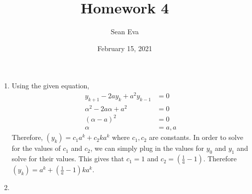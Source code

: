 \documentclass{article}
\title{Homework 4}
\author{Sean Eva}
\date{February 15, 2021}
\begin{document}
\maketitle

\begin{enumerate}
    \item 
    
    Using the given equation, 
    \begin{align*}
        y_{k+1}-2ay_k+a^2y_{k-1}&=0\\
        \alpha^2-2a\alpha+a^2 &= 0\\
        (\alpha-a)^2 &= 0\\
        \alpha &= a, a
    \end{align*}
    Therefore, $(y_k) = c_1a^k + c_2ka^k$ where $c_1, c_2$ are constants. In order to solve for the values of $c_1$ and $c_2$, we can simply plug in the values for $y_0$ and $y_1$ and solve for their values. This gives that $c_1=1$ and $c_2 = (\frac{1}{a}-1)$. Therefore $(y_k) = a^k + (\frac{1}{a}-1)ka^k$.
    
    \item
    

\end{enumerate}
\end{document}
